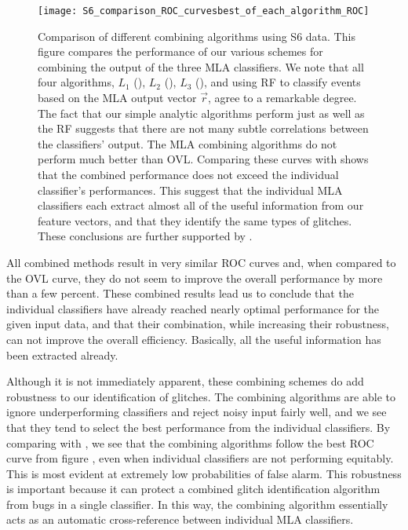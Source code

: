 \documentclass[prd, twocolumn, lengthcheck, superscriptaddress, showpacs, letterpaper, nofootinbib]{revtex4-1}
\begin{document}
\begin{figure}
	\centering
	\texttt{[image: S6\_comparison\_ROC\_curvesbest\_of\_each\_algorithm\_ROC]}
	\caption{Comparison of different combining algorithms using S6 data. This figure compares the performance of our various schemes for combining the output of the three MLA classifiers. We note that all four algorithms,  $L_1$ (),  $L_2$ (), $L_3$ (), and using \ac{RF} to classify events based on the MLA output vector $\vec{r}$, agree to a remarkable degree. The fact that our simple analytic algorithms perform just as well as the \ac{RF} suggests that there are not many subtle correlations between the classifiers' output. The MLA combining algorithms do not perform much better than \ac{OVL}. Comparing these curves with  shows that the combined performance does not exceed the individual classifier's performances. This suggest that the individual MLA classifiers each extract almost all of the useful information from our feature vectors, and that they identify the same types of glitches. These conclusions are further supported by .}
	\label{fig:S6_combining_comparison}
\end{figure}

All combined methods result in very similar \ac{ROC} curves and, when compared to the \ac{OVL} curve, they do not seem to improve the overall performance by more than a few percent. These combined results lead us to conclude that the individual classifiers have already reached nearly optimal performance for the given input data, and that their combination, while increasing their robustness, can not improve the overall efficiency. Basically, all the useful information has been extracted already.      

Although it is not immediately apparent, these combining schemes do add robustness to our identification of glitches. The combining algorithms are able to ignore underperforming classifiers and reject noisy input fairly well, and we see that they tend to select the best performance from the individual classifiers. By comparing  with , we see that the combining algorithms follow the best ROC curve from figure , even when individual classifiers are not performing equitably. This is most evident at extremely low probabilities of false alarm. This robustness is important because it can protect a combined glitch identification algorithm from bugs in a single classifier. In this way, the combining algorithm essentially acts as an automatic cross-reference between individual MLA classifiers.
\end{document}

